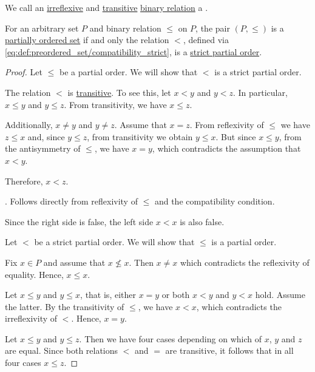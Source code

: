\begin{definition}\label{def:strict_partial_order}
  We call an \hyperref[def:binary_relation/irreflexive]{irreflexive} and \hyperref[def:binary_relation/transitive]{transitive} \hyperref[def:binary_relation]{binary relation} a .
\end{definition}

\begin{proposition}\label{thm:strict_partial_order}
  For an arbitrary set \( P \) and binary relation \( \leq \) on \( P \), the pair \( (P, \leq) \) is a \hyperref[def:partially_ordered_set]{partially ordered set} if and only the relation \( < \), defined via \eqref{eq:def:preordered_set/compatibility_strict}, is a \hyperref[def:strict_partial_order]{strict partial order}.
\end{proposition}
\begin{proof}
  \SufficiencySubProof Let \( \leq \) be a partial order. We will show that \( < \) is a strict partial order.

   The relation \( < \) is \hyperref[def:binary_relation/transitive]{transitive}. To see this, let \( x < y \) and \( y < z \). In particular, \( x \leq y \) and \( y \leq z \). From transitivity, we have \( x \leq z \).

  Additionally, \( x \neq y \) and \( y \neq z \). Assume that \( x = z \). From reflexivity of \( \leq \) we have \( z \leq x \) and, since \( y \leq z \), from transitivity we obtain \( y \leq x \). But since \( x \leq y \), from the antisymmetry of \( \leq \), we have \( x = y \), which contradicts the assumption that \( x < y \).

  Therefore, \( x < z \).

  . Follows directly from reflexivity of \( \leq \) and the compatibility condition.

  Since the right side is false, the left side \( x < x \) is also false.

  \NecessitySubProof Let \( < \) be a strict partial order. We will show that \( \leq \) is a partial order.

   Fix \( x \in P \) and assume that \( x \not\leq x \). Then \( x \neq x \) which contradicts the reflexivity of equality. Hence, \( x \leq x \).

   Let \( x \leq y \) and \( y \leq x \), that is, either \( x = y \) or both \( x < y \) and \( y < x \) hold. Assume the latter. By the transitivity of \( \leq \), we have \( x < x \), which contradicts the irreflexivity of \( < \). Hence, \( x = y \).

   Let \( x \leq y \) and \( y \leq z \). Then we have four cases depending on which of \( x \), \( y \) and \( z \) are equal. Since both relations \( < \) and \( = \) are transitive, it follows that in all four cases \( x \leq z \).
\end{proof}

